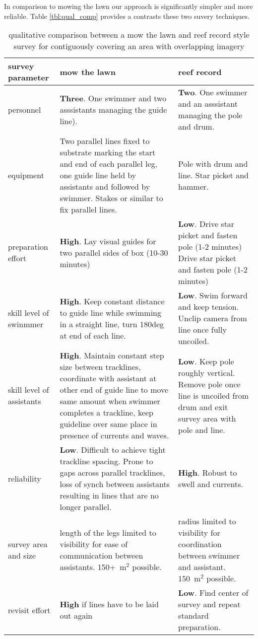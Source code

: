 In comparison to mowing the lawn \cite{Mahon_2011} our approach is significantly simpler and more reliable. Table \ref{tbl:qual_comp} provides a contrasts these two suvery techniques.
\begin{table} 
    \begin{tabular}{ | p{} | p{} | p{} |}
    \hline
survey parameter & mow the lawn & reef record \\
\hline
personnel & \textbf{Three}. One swimmer and two asssistants managing the guide line). & \textbf{Two}. One swimmer and an asssistant managing the pole and drum. \\
\hline
equipment & Two parallel lines fixed to substrate marking the start and end of each parallel leg, one guide line held by assistants and followed by swimmer. Stakes or similar to fix parallel lines. & Pole with drum and line. Star picket and hammer.  \\ 
\hline
preparation effort & \textbf{High}. Lay visual guides for two parallel sides of box (10-30 minutes) & \textbf{Low}. Drive star picket and fasten pole (1-2 minutes) Drive star picket and fasten pole (1-2 minutes) \\ 
\hline
skill level of swinmmer & \textbf{High}. Keep constant distance to guide line while swimming in a straight line, turn 180deg at end of each line. & \textbf{Low}. Swim forward and keep tension. Unclip camera from line once fully uncoiled. \\ 
\hline
        skill level of assistants & \textbf{High}. Maintain constant step size between tracklines, coordinate with assistant at other end of guide line to move same amount when swimmer completes a trackline, keep guideline over same place in presence of currents and waves. & \textbf{Low}. Keep pole roughly vertical. Remove pole once line is uncoiled from drum and exit survey area with pole and line. \\
\hline
reliability & \textbf{Low}. Difficult to achieve tight trackline spacing. Prone to gaps across parallel tracklines, loss of synch between assistants resulting in lines that are no longer parallel. & \textbf{High}. Robust to swell and currents. {Easy to achieve tight trackline spacing by using narrower drum. \\ 
\hline
survey area and size & length of the legs limited to visibility for ease of communication between assistants. 150+~m$^2$ possible.   & radius limited to visibility for coordination between swimmer and assistant. 150~m$^2$ possible.    \\ 
\hline
revisit effort & \textbf{High} if lines have to be laid out again & \textbf{Low}. Find center of survey and repeat standard preparation. \\
\hline
    \end{tabular} 
    \caption{qualitative comparison between a mow the lawn and reef record style survey for contiguously covering an area with overlapping imagery} 
\end{table}



